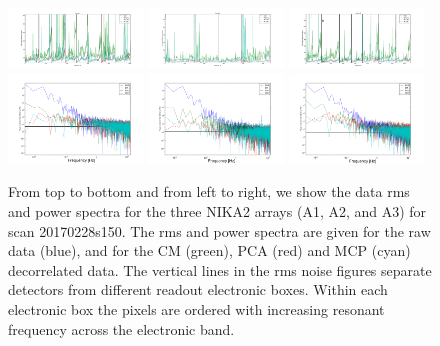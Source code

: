 \begin{figure}[ht!] %
\begin{center}
\includegraphics[clip=true, trim={0.5cm, 0, 0, 0.6cm},width=0.32\textwidth]{Figures/NoiseTests/rms_TOI_array_1_20170228s151.pdf}
\includegraphics[clip=true, trim={0.5cm, 0, 0, 0.6cm},width=0.32\textwidth]{Figures/NoiseTests/rms_TOI_array_2_20170228s151.pdf}
\includegraphics[clip=true, trim={0.5cm, 0, 0, 0.5cm},width=0.32\textwidth]{Figures/NoiseTests/rms_TOI_array_3_20170228s151.pdf}
\includegraphics[clip=true, trim={0.5cm, 0, 0, 0.5cm},width=0.32\textwidth]{Figures/NoiseTests/pws_TOI_array_1_20170228s151_mod.pdf}
\includegraphics[clip=true, trim={0.5cm, 0, 0, 0.5cm},width=0.32\textwidth]{Figures/NoiseTests/pws_TOI_array_2_20170228s151_mod.pdf}
\includegraphics[clip=true, trim={0.5cm, 0, 0, 0.5cm},width=0.32\textwidth]{Figures/NoiseTests/pws_TOI_array_3_20170228s151_mod.pdf}
\end{center}
\caption[Noise RMS and power spectra]{From top to bottom and from left to right,
  we show the data rms and power spectra for the three NIKA2 arrays (A1, A2, and
  A3) for scan 20170228s150. The rms and power spectra are given for the raw
  data (blue), and for the CM (green), PCA (red) and MCP (cyan) decorrelated
  data. The vertical lines in the rms noise figures separate detectors from
  different readout electronic boxes. Within each electronic box the pixels are
  ordered with increasing resonant frequency across the electronic
  band. 
  \label{rmspws}}
\end{figure}

